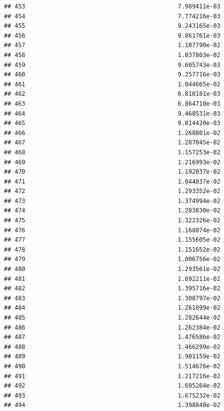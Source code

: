 \documentclass[
]{article}
\begin{document}
\begin{verbatim}
## 453                                           7.989411e-03
## 454                                           7.774216e-03
## 455                                           9.243165e-03
## 456                                           9.861761e-03
## 457                                           1.107790e-02
## 458                                           1.037803e-02
## 459                                           9.605743e-03
## 460                                           9.257716e-03
## 461                                           1.044665e-02
## 462                                           6.810181e-03
## 463                                           6.864710e-03
## 464                                           9.468531e-03
## 465                                           9.814420e-03
## 466                                           1.268801e-02
## 467                                           1.287045e-02
## 468                                           1.157253e-02
## 469                                           1.216993e-02
## 470                                           1.192037e-02
## 471                                           1.044037e-02
## 472                                           1.293352e-02
## 473                                           1.374994e-02
## 474                                           1.283830e-02
## 475                                           1.322326e-02
## 476                                           1.168874e-02
## 477                                           1.155605e-02
## 478                                           1.151652e-02
## 479                                           1.006756e-02
## 480                                           1.293561e-02
## 481                                           1.692211e-02
## 482                                           1.395716e-02
## 483                                           1.308797e-02
## 484                                           1.261899e-02
## 485                                           1.282644e-02
## 486                                           1.262384e-02
## 487                                           1.476586e-02
## 488                                           1.466299e-02
## 489                                           1.901159e-02
## 490                                           1.514676e-02
## 491                                           1.217216e-02
## 492                                           1.695264e-02
## 493                                           1.675232e-02
## 494                                           1.398848e-02

\end{verbatim}
\end{document}
